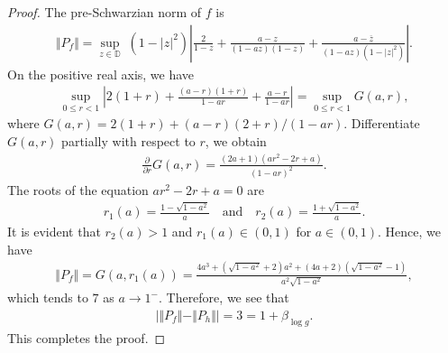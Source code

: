 \documentclass[10pt,a4paper]{amsart}
\newcommand{\beas}{\begin{eqnarray*}}
\newcommand{\eeas}{\end{eqnarray*}}
\newcommand{\ol}{\overline}
\begin{document}
\begin{proof}
The pre-Schwarzian norm of $f$ is 
\beas\Vert P_f\Vert=\sup_{z\in\mathbb{D}}\;(1-|z|^2)\left|\frac{2}{1-z}+\frac{a-z}{(1-az)(1-z)}+\frac{a-\ol{z}}{(1-az)(1-|z|^2)}\right|.\eeas
On the positive real axis, we have 
\beas \sup_{0\leq r<1}\left|2(1+r)+\frac{(a-r)(1+r)}{1-a r}+\frac{a-r}{1-a r}\right|=\sup_{0\leq r<1}G(a, r),\eeas
where $G(a,r)=2(1+r)+(a-r)(2+r)/(1-a r)$. Differentiate $G(a, r)$ partially with respect to $r$, we obtain
\beas \frac{\partial }{\partial r}G(a, r)=\frac{\left(2 a+1\right)\left(a r^2-2 r+a\right)}{(1-a r)^2}.\eeas
The roots of the equation $a r^2-2 r+a=0$ are 
\beas r_1(a)=\frac{1-\sqrt{1-a^2}}{a}\quad\text{and}\quad r_2(a)=\frac{1+\sqrt{1-a^2}}{a}.\eeas
It is evident that $r_2(a)>1$ and $r_1(a)\in(0, 1)$ for $a\in(0, 1)$. Hence, we have  
\beas\Vert P_f\Vert=G(a, r_1(a))=\frac{4 a^3+\left(\sqrt{1-a^2}+2\right) a^2+(4a+2) \left(\sqrt{1-a^2}-1\right)}{a^2 \sqrt{1-a^2}},\eeas
which tends to $7$ as $a\to1^-$. Therefore, we see that 
\beas \left|\Vert P_f \Vert -\Vert P_{h}\Vert \right|=3= 1+\beta_{\log{g}}.\eeas
This completes the proof.
\end{proof}
\end{document}
